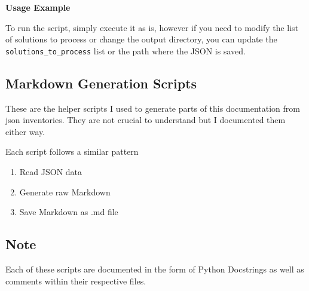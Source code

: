 \textbf{Usage Example}

To run the script, simply execute it as is, however if you need to modify the list of solutions to process or change the output directory, you can update the \\ \texttt{solutions\_to\_process} list or the path where the JSON is saved.

\subsection{Markdown Generation Scripts}

These are the helper scripts I used to generate parts of this documentation from json inventories. They are not crucial to understand but I documented them either way.

Each script follows a similar pattern
\begin{enumerate}
	\item Read JSON data
	\item Generate raw Markdown
	\item Save Markdown as .md file
\end{enumerate}

\subsection{Note}
Each of these scripts are documented in the form of Python Docstrings as well as comments within their respective files.